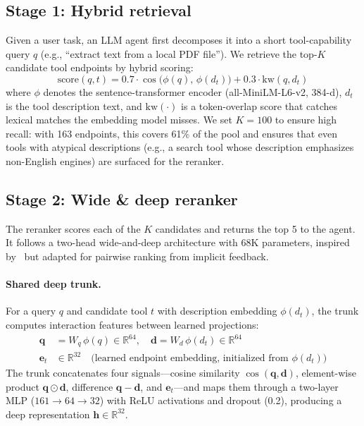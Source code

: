 \documentclass{article}
\begin{document}
\subsection{Stage 1: Hybrid retrieval}

Given a user task, an LLM agent first decomposes it into a short tool-capability query $q$ (e.g., ``extract text from a local PDF file''). We retrieve the top-$K$ candidate tool endpoints by hybrid scoring:
%
\begin{equation}
  \text{score}(q, t) = 0.7 \cdot \cos\bigl(\phi(q),\, \phi(d_t)\bigr) + 0.3 \cdot \text{kw}(q, d_t)
\end{equation}
%
where $\phi$ denotes the sentence-transformer encoder (all-MiniLM-L6-v2, 384-d), $d_t$ is the tool description text, and $\text{kw}(\cdot)$ is a token-overlap score that catches lexical matches the embedding model misses. We set $K{=}100$ to ensure high recall: with 163 endpoints, this covers 61\% of the pool and ensures that even tools with atypical descriptions (e.g., a search tool whose description emphasizes non-English engines) are surfaced for the reranker.

\subsection{Stage 2: Wide \& deep reranker}

The reranker scores each of the $K$ candidates and returns the top 5 to the agent. It follows a two-head wide-and-deep architecture with 68K parameters, inspired by~\citet{cheng2016wide} but adapted for pairwise ranking from implicit feedback.

\paragraph{Shared deep trunk.} For a query $q$ and candidate tool $t$ with description embedding $\phi(d_t)$, the trunk computes interaction features between learned projections:
%
\begin{align}
  \mathbf{q} &= W_q\, \phi(q) \in \mathbb{R}^{64}, \quad \mathbf{d} = W_d\, \phi(d_t) \in \mathbb{R}^{64} \\
  \mathbf{e}_t &\in \mathbb{R}^{32} \quad \text{(learned endpoint embedding, initialized from } \phi(d_t)\text{)}
\end{align}
%
The trunk concatenates four signals---cosine similarity $\cos(\mathbf{q}, \mathbf{d})$, element-wise product $\mathbf{q} \odot \mathbf{d}$, difference $\mathbf{q} - \mathbf{d}$, and $\mathbf{e}_t$---and maps them through a two-layer MLP ($161 \to 64 \to 32$) with ReLU activations and dropout (0.2), producing a deep representation $\mathbf{h} \in \mathbb{R}^{32}$.
\end{document}
